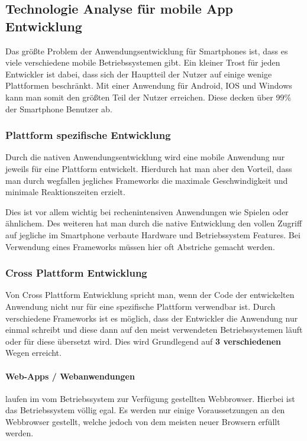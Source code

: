 \subsection{Technologie Analyse für mobile App Entwicklung}\label{MobileAnwedungsentwicklung}
Das größte Problem der Anwendungsentwicklung für Smartphones ist, dass es viele verschiedene mobile Betriebssystemen gibt. Ein kleiner Trost für jeden Entwickler ist dabei, dass sich der Hauptteil der Nutzer auf einige wenige Plattformen beschränkt. Mit einer Anwendung für Android, IOS und Windows kann man somit den größten Teil der Nutzer erreichen. Diese decken über 99\% \cite{STA16} der Smartphone Benutzer ab.

 
\subsubsection{Plattform spezifische Entwicklung}
Durch die nativen Anwendungsentwicklung wird eine mobile Anwendung nur jeweils für eine Plattform entwickelt. Hierdurch hat man aber den Vorteil, dass man durch wegfallen jegliches Frameworks die maximale Geschwindigkeit und minimale Reaktionszeiten erzielt.

Dies ist vor allem wichtig bei rechenintensiven Anwendungen wie Spielen oder ähnlichem. Des weiteren hat man durch die native Entwicklung den vollen Zugriff auf jegliche im Smartphone verbaute Hardware und Betriebssystem Features. Bei Verwendung eines Frameworks müssen hier oft Abstriche gemacht werden.

\subsubsection{Cross Plattform Entwicklung}
Von Cross Plattform Entwicklung spricht man, wenn der Code der entwickelten Anwendung nicht nur für eine spezifische Plattform verwendbar ist. Durch verschiedene Frameworks ist es möglich, dass der Entwickler die Anwendung nur einmal schreibt und diese dann auf den meist verwendeten Betriebssystemen läuft oder für diese übersetzt wird. Dies wird Grundlegend auf \textbf{3 verschiedenen} Wegen erreicht.

\paragraph{Web-Apps / Webanwendungen}laufen im vom Betriebssystem zur Verfügung gestellten Webbrowser. Hierbei ist das Betriebssystem völlig egal. Es werden nur einige Voraussetzungen an den Webbrowser gestellt, welche jedoch von dem meisten neuer Browsern erfüllt werden.

